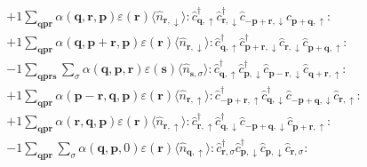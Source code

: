 \begin{align*}
		&+1 \sum_{ \mathbf{q} \mathbf{p} \mathbf{r} } \alpha( \mathbf{q}, \mathbf{r}, \mathbf{p} )  \varepsilon( \mathbf{r} )   \langle \hat{n}_{ \mathbf{r}, \downarrow } \rangle :\hat{c}_{ \mathbf{q}, \uparrow }^\dagger \hat{c}_{ \mathbf{r}, \downarrow }^\dagger \hat{c}_{ -\mathbf{p}+\mathbf{r}, \downarrow }^{\phantom{\dagger}}\hat{c}_{ \mathbf{p}+\mathbf{q}, \uparrow }^{\phantom{\dagger}}: \\
	&+1 \sum_{ \mathbf{q} \mathbf{p} \mathbf{r} } \alpha( \mathbf{q}, \mathbf{p}+\mathbf{r}, \mathbf{p} )  \varepsilon( \mathbf{r} )   \langle \hat{n}_{ \mathbf{r}, \downarrow } \rangle :\hat{c}_{ \mathbf{q}, \uparrow }^\dagger \hat{c}_{ \mathbf{p}+\mathbf{r}, \downarrow }^\dagger \hat{c}_{ \mathbf{r}, \downarrow }^{\phantom{\dagger}}\hat{c}_{ \mathbf{p}+\mathbf{q}, \uparrow }^{\phantom{\dagger}}: \\
	&-1 \sum_{ \mathbf{q} \mathbf{p} \mathbf{r} \mathbf{s} } \sum_{ \sigma } \alpha( \mathbf{q}, \mathbf{p}, \mathbf{r} )  \varepsilon( \mathbf{s} )   \langle \hat{n}_{ \mathbf{s}, \sigma } \rangle :\hat{c}_{ \mathbf{q}, \uparrow }^\dagger \hat{c}_{ \mathbf{p}, \downarrow }^\dagger \hat{c}_{ \mathbf{p}-\mathbf{r}, \downarrow }^{\phantom{\dagger}}\hat{c}_{ \mathbf{q}+\mathbf{r}, \uparrow }^{\phantom{\dagger}}: \\
	&+1 \sum_{ \mathbf{q} \mathbf{p} \mathbf{r} } \alpha( \mathbf{p}-\mathbf{r}, \mathbf{q}, \mathbf{p} )  \varepsilon( \mathbf{r} )   \langle \hat{n}_{ \mathbf{r}, \uparrow } \rangle :\hat{c}_{ -\mathbf{p}+\mathbf{r}, \uparrow }^\dagger \hat{c}_{ \mathbf{q}, \downarrow }^\dagger \hat{c}_{ -\mathbf{p}+\mathbf{q}, \downarrow }^{\phantom{\dagger}}\hat{c}_{ \mathbf{r}, \uparrow }^{\phantom{\dagger}}: \\
	&+1 \sum_{ \mathbf{q} \mathbf{p} \mathbf{r} } \alpha( \mathbf{r}, \mathbf{q}, \mathbf{p} )  \varepsilon( \mathbf{r} )   \langle \hat{n}_{ \mathbf{r}, \uparrow } \rangle :\hat{c}_{ \mathbf{r}, \uparrow }^\dagger \hat{c}_{ \mathbf{q}, \downarrow }^\dagger \hat{c}_{ -\mathbf{p}+\mathbf{q}, \downarrow }^{\phantom{\dagger}}\hat{c}_{ \mathbf{p}+\mathbf{r}, \uparrow }^{\phantom{\dagger}}: \\
	&-1 \sum_{ \mathbf{q} \mathbf{p} \mathbf{r} } \sum_{ \sigma } \alpha( \mathbf{q}, \mathbf{p}, 0 )  \varepsilon( \mathbf{r} )   \langle \hat{n}_{ \mathbf{q}, \uparrow } \rangle :\hat{c}_{ \mathbf{r}, \sigma }^\dagger \hat{c}_{ \mathbf{p}, \downarrow }^\dagger \hat{c}_{ \mathbf{p}, \downarrow }^{\phantom{\dagger}}\hat{c}_{ \mathbf{r}, \sigma }^{\phantom{\dagger}}: \\

\end{align*}
